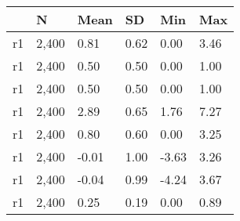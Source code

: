\begin{table}[htbp]
\begin{tabular}{|l|l|l|l|l|l|}\hline  
 & N  & Mean  & SD  & Min  & Max  \\ \hline  
r1 &     2,400 &      0.81 &      0.62 &      0.00 &      3.46 \\ \hline 
r1 &     2,400 &      0.50 &      0.50 &      0.00 &      1.00 \\ \hline 
r1 &     2,400 &      0.50 &      0.50 &      0.00 &      1.00 \\ \hline 
r1 &     2,400 &      2.89 &      0.65 &      1.76 &      7.27 \\ \hline 
r1 &     2,400 &      0.80 &      0.60 &      0.00 &      3.25 \\ \hline 
r1 &     2,400 &     -0.01 &      1.00 &     -3.63 &      3.26 \\ \hline 
r1 &     2,400 &     -0.04 &      0.99 &     -4.24 &      3.67 \\ \hline 
r1 &     2,400 &      0.25 &      0.19 &      0.00 &      0.89 \\ \hline 
  \end{tabular}
\end{table}
